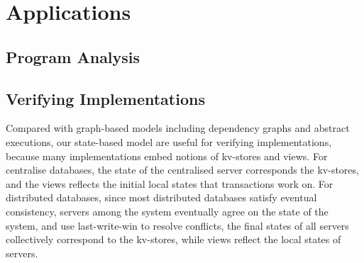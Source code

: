 \section{Applications}
\label{sec:applications}

\subsection{Program Analysis}

\subsection{Verifying Implementations}
Compared with graph-based models including dependency graphs and abstract executions,
our state-based model are useful for verifying implementations,
because many implementations embed notions of kv-stores and views.
For centralise databases, the state of the centralised server corresponds the kv-stores,
and the views reflects the initial local states that transactions work on.
For distributed databases, since most distributed databases satisfy eventual consistency, 
\ie servers among the system eventually agree on the state of the system,
and use last-write-win to resolve conflicts,
the final states of all servers collectively correspond to the kv-stores,
while views reflect the local states of servers.

